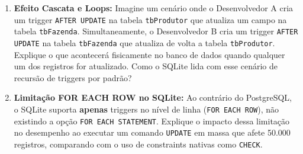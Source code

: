 \documentclass[12pt,a4paper]{article}
\newcommand{\resposta}[1]{}
\begin{document}
\begin{enumerate}[label=\textbf{Exercício \arabic* -}, leftmargin=*, itemsep=2.5em]
\begin{enumerate}[label=\textbf{\alph*)}]
    \item \textbf{Efeito Cascata e Loops:} Imagine um cenário onde o Desenvolvedor A cria um trigger \texttt{AFTER UPDATE} na tabela \texttt{tbProdutor} que atualiza um campo na tabela \texttt{tbFazenda}. Simultaneamente, o Desenvolvedor B cria um trigger \texttt{AFTER UPDATE} na tabela \texttt{tbFazenda} que atualiza de volta a tabela \texttt{tbProdutor}. Explique o que acontecerá fisicamente no banco de dados quando qualquer um dos registros for atualizado. Como o SQLite lida com esse cenário de recursão de triggers por padrão?
    \resposta{3cm}

    \item \textbf{Limitação FOR EACH ROW no SQLite:} Ao contrário do PostgreSQL, o SQLite suporta \textbf{apenas} triggers no nível de linha (\texttt{FOR EACH ROW}), não existindo a opção \texttt{FOR EACH STATEMENT}. Explique o impacto dessa limitação no desempenho ao executar um comando \texttt{UPDATE} em massa que afete 50.000 registros, comparando com o uso de constraints nativas como \texttt{CHECK}.
    \resposta{3cm}
\end{enumerate}

\end{enumerate}
\end{document}
